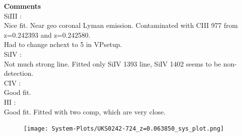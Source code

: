\documentclass[12pt]{report}
\begin{document}
\textbf{Comments}  \\


SiIII :  \\  \hspace*{1.5cm}
        Nice fit. Near geo coronal Lyman emission. Contaminated with CIII 977 from z=0.242393 and z=0.242580.  \\
        Had to change nchext to 5 in VPsetup.  \\

SiIV :  \\  \hspace*{1.5cm}
        Not much strong line. Fitted only SiIV 1393 line, SiIV 1402 seems to be non-detection.  \\

CIV :  \\  \hspace*{1.5cm}
        Good fit. \\

HI :  \\  \hspace*{1.5cm}
        Good fit. Fitted with two comp, which are very close. \\


\newpage

\begin{landscape}

\begin{figure}
    \centering
    \vspace{-20mm}
    \hspace*{-35mm}
    \texttt{[image: System-Plots/UKS0242-724\_z=0.063850\_sys\_plot.png]}
\end{figure}

\end{landscape}
\end{document}
